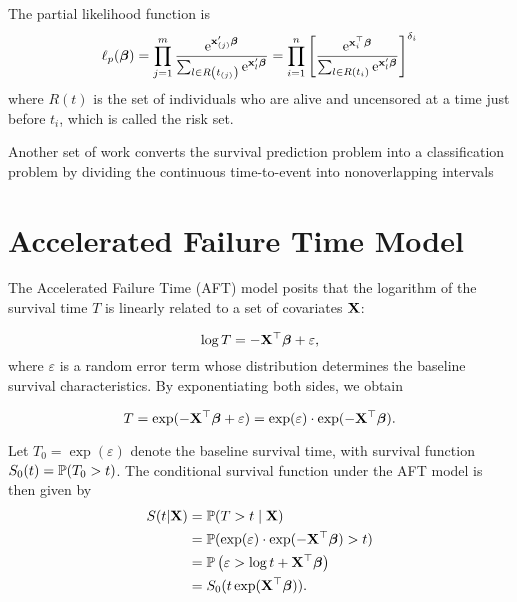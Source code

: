 The partial likelihood function is
\begin{equation}
	\ell_{p}(\boldsymbol{\beta})=\prod_{j=1}^{m}\frac{\mathrm{e}^{\mathbf{x}_{(j)}^{\prime}\boldsymbol{\beta}}}{\sum_{l\in R\left(t_{(j)}\right)}\mathrm{e}^{\mathbf{x}_{l}^{\prime}\boldsymbol{\beta}}}=\prod_{i=1}^{n}\left[\frac{\mathrm{e}^{\mathbf{x}_{i}^{\top}\boldsymbol{\beta}}}{\sum_{l\in R\left(t_{i}\right)}\mathrm{e}^{\mathbf{x}_{l}^{\prime}\boldsymbol{\beta}}}\right]^{\delta_{i}}
\end{equation}
where \(R(t)\) is the set of individuals who are alive and uncensored at a time just before \(t_{i}\), which is called the risk set.

Another set of work converts the survival prediction problem into a classification problem by dividing the continuous time-to-event into nonoverlapping intervals

\section{Accelerated Failure Time Model}

The Accelerated Failure Time (AFT) model posits that the logarithm of the survival time \( T \) is linearly related to a set of covariates \( \mathbf{X} \):

\begin{equation}
	\log T = -\mathbf{X}^\top \boldsymbol{\beta} + \varepsilon,
\end{equation}
where \( \varepsilon \) is a random error term whose distribution determines the baseline survival characteristics. By exponentiating both sides, we obtain

\begin{equation*}
	T = \exp(-\mathbf{X}^\top \boldsymbol{\beta} + \varepsilon) = \exp(\varepsilon) \cdot \exp(-\mathbf{X}^\top \boldsymbol{\beta}).
\end{equation*}

Let \( T_0 = \exp(\varepsilon) \) denote the baseline survival time, with survival function \( S_0(t) = \mathbb{P}(T_0 > t) \). The conditional survival function under the AFT model is then given by
\begin{equation*}
	\begin{aligned}
		S(t|\mathbf{X}) & = \mathbb{P}(T > t \mid \mathbf{X})                                      \\
		          & = \mathbb{P}(\exp(\varepsilon) \cdot \exp(-\mathbf{X}^\top \boldsymbol{\beta}) > t) \\
		          & = \mathbb{P}\left(\varepsilon > \log t + \mathbf{X}^\top \boldsymbol{\beta} \right) \\
		          & = S_0(t \exp(\mathbf{X}^\top \boldsymbol{\beta})).
	\end{aligned}
\end{equation*}

